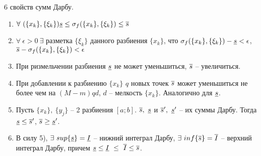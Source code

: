 \begin{theor}
6 свойств сумм Дарбу.
\begin{enumerate}
\item $\forall\ (\{x_k\},\{\xi_k\}) \underline{s}\leq\sigma_f(\{x_k\},\{\xi_k\})\leq\overline{s}$
\item $\forall\ \epsilon>0\ \exists$ разметка $\{\xi_k\}$ данного разбиения $\{x_k\}$, что $\sigma_f(\{x_k\},\{\xi_k\})-\underline{s}<\epsilon$, $\overline{s}-\sigma_f(\{x_k\},\{\xi_k\})<\epsilon$
\item При ризмельчении разбиения $\underline{s}$ не может уменьшиться, $\overline{s}$ -- увеличиться.
\item При добавлении к разбиению $\{x_k\}$ $q$ новых точек $\overline{s}$ может уменьшиться не более чем на $(M-m)qd$, $d$ -- мелкость $\{x_k\}$. Аналогично для $\underline{s}$.
\item Пусть $\{x_k\},\ \{y_j\}$ -- 2 разбиения $[a;b]$. $\overline{s},\ \underline{s}$ и $\overline{s}',\ \underline{s}'$ -- их суммы Дарбу. Тогда $\underline{s}\leq\overline{s}'$, $\overline{s}\geq\underline{s}'$.
\item В силу 5), $\exists\ sup\{\ns\}=\underline{I}$ -- нижний интеграл Дарбу, $\exists\ inf\{\overline{s}\}=\overline{I}$ -- верхний интеграл Дарбу, причем $\ns\leq\underline{I}\ \leq\ \overline{I}\leq\vs$.
\end{enumerate}
\end{theor}
